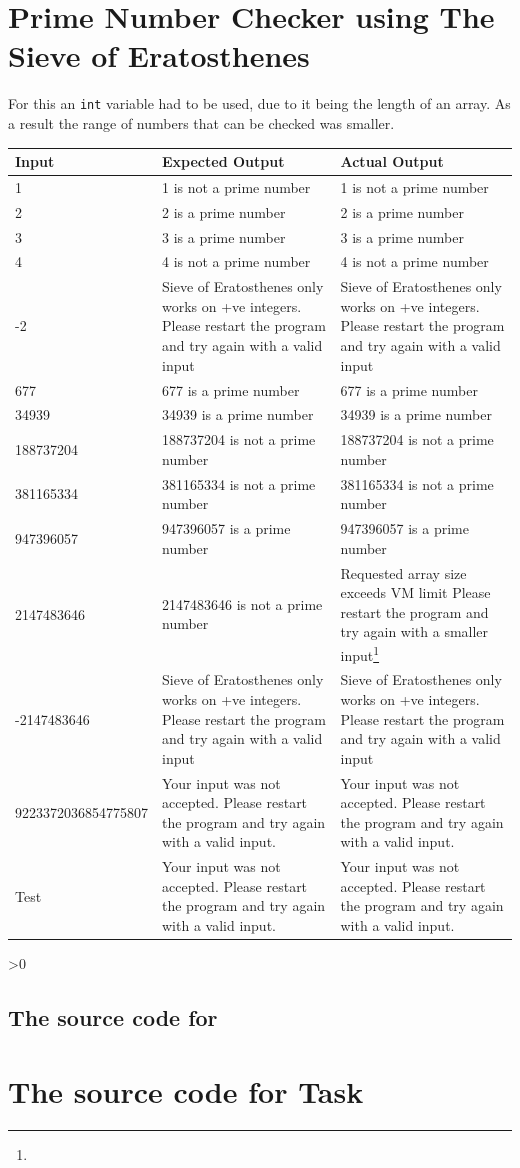 \documentclass[12pt,a4paper,onesided]{report}
\newcommand{\source}{\pagebreak
	\ifnum\value{section}>0
		\subsection{The source code for \thesection}

	\else
		\section{The source code for Task \thechapter}

	\fi
	}
\begin{document}
\section{Prime Number Checker using The Sieve of Eratosthenes}
For this an \lstinline|int| variable had to be used, due to it being the length of an array. As a result the range of numbers that can be checked was smaller.
\begin{table}[h!]
	\centering
	\begin{tabular}{lp{30ex}p{30ex}}
		\toprule Input & Expected Output & Actual Output\\
		\midrule
		1 & 1 is not a prime number& 1 is not a prime number\\
		2 & 2 is a prime number & 2 is a prime number\\
		3 & 3 is a prime number & 3 is a prime number\\
		4 & 4 is not a prime number & 4 is not a prime number\\
		-2 & Sieve of Eratosthenes only works on +ve integers. Please restart the program and try again with a valid input & Sieve of Eratosthenes only works on +ve integers. Please restart the program and try again with a valid input\\
		677 & 677 is a prime number & 677 is a prime number\\
		34939 & 34939 is a prime number & 34939 is a prime number\\
		188737204 & 188737204 is not a prime number & 188737204 is not a prime number\\
		381165334 & 381165334 is not a prime number & 381165334 is not a prime number\\
		947396057 & 947396057 is a prime number & 947396057 is a prime number\\
		2147483646& 2147483646 is not a prime number & Requested array size exceeds VM limit Please restart the program and try again with a smaller input\footnote{} \\ 
		-2147483646 & Sieve of Eratosthenes only works on +ve integers. Please restart the program and try again with a valid input & Sieve of Eratosthenes only works on +ve integers. Please restart the program and try again with a valid input\\
		9223372036854775807 & Your input was not accepted. Please restart the program and try again with a valid input.
		 & Your input was not accepted. Please restart the program and try again with a valid input.\\
		Test & Your input was not accepted. Please restart the program and try again with a valid input.
		& Your input was not accepted. Please restart the program and try again with a valid input.\\
		\bottomrule
	\end{tabular}
\end{table}
\source

\end{document}
